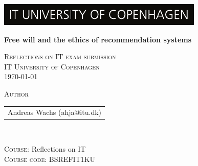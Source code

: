 \begin{titlepage}
  
  \includegraphics[width=\textwidth]{images/ITU_LOGO.pdf}
  
  \begin{center}
 
    {\Huge\textbf{Free will and the ethics of recommendation systems} \par}
    \vspace{1cm}
    
   \textsc{
        Reflections on IT exam submission \\
        IT University of Copenhagen \\
        \today
    }

    \vspace{2cm}

    \textsc{
        \large
        Author
    }\\
    \begin{tabular}{c}
            Andreas Wachs (ahja@itu.dk) \\
    \end{tabular}\\
    \vspace{2cm}

    \textsc{\large
        Course: 
    } Reflections on IT\\
    \textsc{\large
        Course code: 
    }
    BSREFIT1KU
    \vspace{2cm}\\

  \end{center}
  
  \vspace*{\fill}

\end{titlepage}